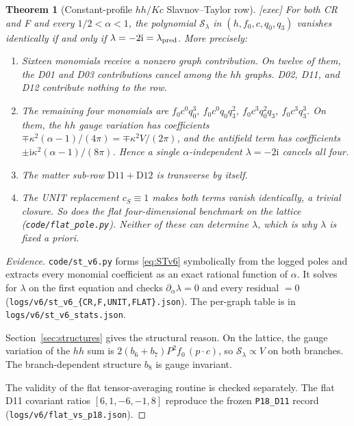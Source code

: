 \documentclass[11pt,a4paper]{article}
\newcommand{\ka}{\kappa}
\newcommand{\ii}{\mathrm i}
\newcommand{\loc}[1]{\nolinkurl{#1}}
\theoremstyle{plain}
\newtheorem{theorem}{Theorem}[section]
\theoremstyle{definition}
\theoremstyle{remark}
\numberwithin{equation}{section}
\begin{document}
\begin{theorem}[Constant-profile \(hh/Kc\) Slavnov--Taylor row]
\label{thm:STclosure}
\textsf{[exec]}
For both CR and F and every \(1/2<\alpha<1\), the polynomial
\(\mathcal S_\lambda\) in
\((h,f_0,c,q_0,q_3)\) vanishes identically if and only if
\(\lambda=-2\ii=\lambda_{\rm pred}\).
More precisely:
\begin{enumerate}[label=\textup{(\roman*)}]
\item Sixteen monomials receive a nonzero graph contribution.
On twelve of them, the D01 and D03 contributions cancel among the
\(hh\) graphs.
D02, D11, and D12 contribute nothing to the row.
\item The remaining four monomials are
\(f_0c^0q_0^3,\ f_0c^0q_0q_3^2,\ f_0c^3q_0^2q_3,\ f_0c^3q_3^3\).
On them, the \(hh\) gauge variation has coefficients
\(\mp\ka^2(\alpha-1)/(4\pi)=\mp\ka^2V/(2\pi)\), and the antifield
term has coefficients
\(\pm\ii\ka^2(\alpha-1)/(8\pi)\).
Hence a single \(\alpha\)-independent \(\lambda=-2\ii\) cancels
all four.
\item The matter sub-row \(\mathrm{D11}+\mathrm{D12}\) is
transverse by itself.
\item The UNIT replacement \(c_S\equiv1\) makes both terms vanish
identically, a trivial closure.
So does the flat four-dimensional benchmark on the lattice
(\loc{code/flat_pole.py}).
Neither of these can determine \(\lambda\), which is why
\(\lambda\) is fixed \emph{a priori}.
\end{enumerate}
\end{theorem}

\begin{proof}[Evidence]
\loc{code/st_v6.py} forms \eqref{eq:STv6} symbolically from the
logged poles and extracts every monomial coefficient as an exact
rational function of \(\alpha\).
It solves for \(\lambda\) on the first equation and checks
\(\partial_\alpha\lambda=0\) and every residual \(=0\)
(\loc{logs/v6/st_v6_\{CR,F,UNIT,FLAT\}.json}).
The per-graph table is in \loc{logs/v6/st_v6\_stats.json}.

Section~\ref{sec:structures} gives the structural reason.
On the lattice, the gauge variation of the \(hh\) sum is
\(2(b_6+b_7)P^2f_0\,(p\cdot c)\), so
\(\mathcal S_\lambda\propto V\) on both branches.
The branch-dependent structure \(b_8\) is gauge invariant.

The validity of the flat tensor-averaging routine is checked
separately. The flat D11 covariant ratios \([6,1,-6,-1,8]\)
reproduce the frozen \texttt{P18\_D11} record
(\loc{logs/v6/flat\_vs\_p18.json}).
\end{proof}
\end{document}

